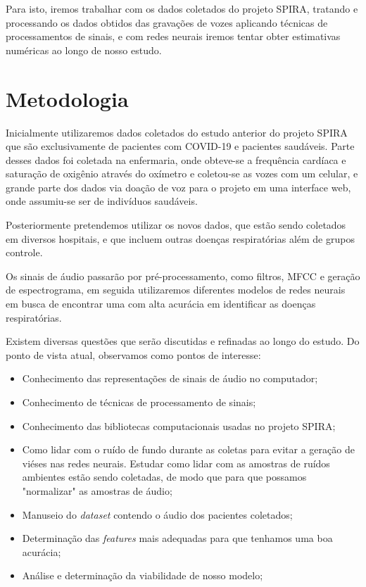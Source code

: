 \documentclass[12pt, a4paper]{article}
\begin{document}
Para isto, iremos trabalhar com os dados coletados do projeto SPIRA, tratando e processando os dados obtidos das gravações de vozes aplicando técnicas de processamentos de sinais, e com redes neurais iremos tentar obter estimativas numéricas ao longo de nosso estudo.

\section{Metodologia}

Inicialmente utilizaremos dados coletados do estudo anterior do projeto SPIRA que são exclusivamente de pacientes com COVID-19 e pacientes saudáveis. Parte desses dados foi coletada na enfermaria, onde obteve-se a frequência cardíaca e saturação de oxigênio através do oxímetro e coletou-se as vozes com um celular, e grande parte dos dados via doação de voz para o projeto em uma interface web, onde assumiu-se ser de indivíduos saudáveis.

Posteriormente pretendemos utilizar os novos dados, que estão sendo coletados em diversos hospitais, e que incluem outras doenças respiratórias além de grupos controle.

Os sinais de áudio passarão por pré-processamento, como filtros, MFCC e geração de espectrograma, em seguida utilizaremos diferentes modelos de redes neurais em busca de encontrar uma com alta acurácia em identificar as doenças respiratórias.

Existem diversas questões que serão discutidas e refinadas ao longo do estudo. Do ponto de vista atual, observamos como pontos de interesse:
\begin{itemize}
    \item Conhecimento das representações de sinais de áudio no computador;
    \item Conhecimento de técnicas de processamento de sinais;
    \item Conhecimento das bibliotecas computacionais usadas no projeto SPIRA;
    \item Como lidar com o ruído de fundo durante as coletas para evitar a geração de viéses nas redes neurais. Estudar como lidar com as amostras de ruídos ambientes estão sendo coletadas, de modo que para que possamos "normalizar" as amostras de áudio;
    \item Manuseio do \textit{dataset} contendo o áudio dos pacientes coletados;
    \item Determinação das \textit{features} mais adequadas para que tenhamos uma boa acurácia;
    \item Análise e determinação da viabilidade de nosso modelo;
\end{itemize}
\end{document}
